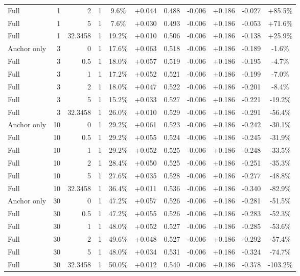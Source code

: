 \begin{table}[htbp]
\begin{tabular}{lrrrccccccc}
Full & 1 & 2 & 1 & 9.6\% & +0.044 & 0.488 & -0.006 & +0.186 & -0.027 & +85.5\% \\
Full & 1 & 5 & 1 & 7.6\% & +0.030 & 0.493 & -0.006 & +0.186 & -0.053 & +71.6\% \\
Full & 1 & 32.3458 & 1 & 19.2\% & +0.010 & 0.506 & -0.006 & +0.186 & -0.138 & +25.9\% \\
Anchor only & 3 & 0 & 1 & 17.6\% & +0.063 & 0.518 & -0.006 & +0.186 & -0.189 & -1.6\% \\
Full & 3 & 0.5 & 1 & 18.0\% & +0.057 & 0.519 & -0.006 & +0.186 & -0.195 & -4.7\% \\
Full & 3 & 1 & 1 & 17.2\% & +0.052 & 0.521 & -0.006 & +0.186 & -0.199 & -7.0\% \\
Full & 3 & 2 & 1 & 18.0\% & +0.047 & 0.522 & -0.006 & +0.186 & -0.201 & -8.4\% \\
Full & 3 & 5 & 1 & 15.2\% & +0.033 & 0.527 & -0.006 & +0.186 & -0.221 & -19.2\% \\
Full & 3 & 32.3458 & 1 & 26.0\% & +0.010 & 0.529 & -0.006 & +0.186 & -0.291 & -56.4\% \\
Anchor only & 10 & 0 & 1 & 29.2\% & +0.061 & 0.523 & -0.006 & +0.186 & -0.242 & -30.1\% \\
Full & 10 & 0.5 & 1 & 29.2\% & +0.055 & 0.524 & -0.006 & +0.186 & -0.245 & -31.9\% \\
Full & 10 & 1 & 1 & 29.2\% & +0.052 & 0.525 & -0.006 & +0.186 & -0.248 & -33.5\% \\
Full & 10 & 2 & 1 & 28.4\% & +0.050 & 0.525 & -0.006 & +0.186 & -0.251 & -35.3\% \\
Full & 10 & 5 & 1 & 27.6\% & +0.035 & 0.528 & -0.006 & +0.186 & -0.277 & -48.8\% \\
Full & 10 & 32.3458 & 1 & 36.4\% & +0.011 & 0.536 & -0.006 & +0.186 & -0.340 & -82.9\% \\
Anchor only & 30 & 0 & 1 & 47.2\% & +0.057 & 0.526 & -0.006 & +0.186 & -0.281 & -51.5\% \\
Full & 30 & 0.5 & 1 & 47.2\% & +0.055 & 0.526 & -0.006 & +0.186 & -0.283 & -52.3\% \\
Full & 30 & 1 & 1 & 48.0\% & +0.052 & 0.527 & -0.006 & +0.186 & -0.285 & -53.6\% \\
Full & 30 & 2 & 1 & 49.6\% & +0.048 & 0.527 & -0.006 & +0.186 & -0.292 & -57.4\% \\
Full & 30 & 5 & 1 & 48.0\% & +0.034 & 0.531 & -0.006 & +0.186 & -0.324 & -74.7\% \\
Full & 30 & 32.3458 & 1 & 50.0\% & +0.012 & 0.540 & -0.006 & +0.186 & -0.378 & -103.2\% \\

\end{tabular}
\end{table}
